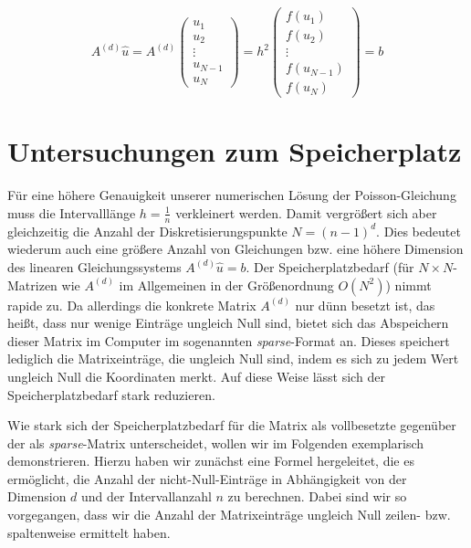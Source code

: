 \documentclass{scrartcl}
\begin{document}
\[A^{(d)}\hat{u}=
A^{(d)}
\begin{pmatrix}
  u_1\\
  u_2\\
  \vdots\\
  u_{N-1}\\
  u_N
\end{pmatrix}
=
h^2
\begin{pmatrix}
  f(u_1)\\
  f(u_2)\\
  \vdots\\
  f(u_{N-1})\\
  f(u_N)
\end{pmatrix}
= b
\]

\pagebreak
\section{Untersuchungen zum Speicherplatz}
Für eine höhere Genauigkeit unserer numerischen Lösung der Poisson-Gleichung muss die Intervalllänge $h=\frac{1}{n}$ verkleinert werden.
Damit vergrößert sich aber gleichzeitig die Anzahl der Diskretisierungspunkte $N=(n-1)^d$.
Dies bedeutet wiederum auch eine größere Anzahl von Gleichungen bzw. eine höhere Dimension des linearen Gleichungssystems $A^{(d)}\hat{u}=b$.
Der Speicherplatzbedarf (für $N\times N$-Matrizen wie $A^{(d)}$ im Allgemeinen in der Größenordnung $O(N^2)$) nimmt rapide zu.
Da allerdings die konkrete Matrix $A^{(d)}$ nur dünn besetzt ist, das heißt, dass nur wenige Einträge ungleich Null sind, bietet sich das Abspeichern dieser Matrix im Computer im sogenannten \textit{sparse}-Format an.
Dieses speichert lediglich die Matrixeinträge, die ungleich Null sind, indem es sich zu jedem Wert ungleich Null die Koordinaten merkt.
Auf diese Weise lässt sich der Speicherplatzbedarf stark reduzieren.

Wie stark sich der Speicherplatzbedarf für die Matrix als vollbesetzte gegenüber der als \textit{sparse}-Matrix unterscheidet, wollen wir im Folgenden exemplarisch demonstrieren.
Hierzu haben wir zunächst eine Formel hergeleitet, die es ermöglicht, die Anzahl der nicht-Null-Einträge in Abhängigkeit von der Dimension $d$ und der Intervallanzahl $n$ zu berechnen. Dabei sind wir so vorgegangen, dass wir die Anzahl der Matrixeinträge ungleich Null zeilen- bzw. spaltenweise ermittelt haben.
\end{document}
